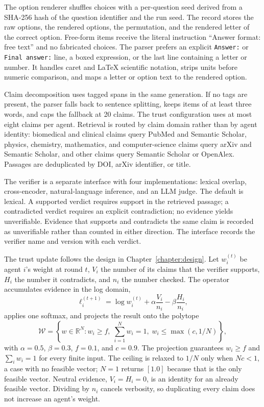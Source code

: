 The option renderer shuffles choices with a per-question seed derived from a SHA-256 hash of the question identifier and the run seed. The record stores the raw options, the rendered options, the permutation, and the rendered letter of the correct option. Free-form items receive the literal instruction ``Answer format: free text'' and no fabricated choices. The parser prefers an explicit \texttt{Answer:} or \texttt{Final answer:} line, a boxed expression, or the last line containing a letter or number. It handles caret and LaTeX scientific notation, strips units before numeric comparison, and maps a letter or option text to the rendered option.

Claim decomposition uses tagged spans in the same generation. If no tags are present, the parser falls back to sentence splitting, keeps items of at least three words, and caps the fallback at 20 claims. The trust configuration uses at most eight claims per agent. Retrieval is routed by claim domain rather than by agent identity: biomedical and clinical claims query PubMed and Semantic Scholar, physics, chemistry, mathematics, and computer-science claims query arXiv and Semantic Scholar, and other claims query Semantic Scholar or OpenAlex. Passages are deduplicated by DOI, arXiv identifier, or title.

The verifier is a separate interface with four implementations: lexical overlap, cross-encoder, natural-language inference, and an LLM judge. The default is lexical. A supported verdict requires support in the retrieved passage; a contradicted verdict requires an explicit contradiction; no evidence yields unverifiable. Evidence that supports and contradicts the same claim is recorded as unverifiable rather than counted in either direction. The interface records the verifier name and version with each verdict.

The trust update follows the design in Chapter~\ref{chapter:design}. Let $w_i^{(t)}$ be agent $i$'s weight at round $t$, $V_i$ the number of its claims that the verifier supports, $H_i$ the number it contradicts, and $n_i$ the number checked. The operator accumulates evidence in the log domain,
\begin{equation}
  \ell_i^{(t+1)} = \log w_i^{(t)} + \alpha \frac{V_i}{n_i} - \beta \frac{H_i}{n_i},
  \label{eq:impl-trust-update}
\end{equation}
applies one softmax, and projects the result onto the polytope
\begin{equation}
  \mathcal{W} = \left\{ w \in \mathbb{R}^{N} : w_i \ge f,\; \sum_{i=1}^{N} w_i = 1,\; w_i \le \max(c, 1/N) \right\},
  \label{eq:impl-trust-simplex}
\end{equation}
with $\alpha=0.5$, $\beta=0.3$, $f=0.1$, and $c=0.9$. The projection guarantees $w_i \ge f$ and $\sum_i w_i = 1$ for every finite input. The ceiling is relaxed to $1/N$ only when $Nc<1$, a case with no feasible vector; $N=1$ returns $[1.0]$ because that is the only feasible vector. Neutral evidence, $V_i=H_i=0$, is an identity for an already feasible vector. Dividing by $n_i$ cancels verbosity, so duplicating every claim does not increase an agent's weight.

